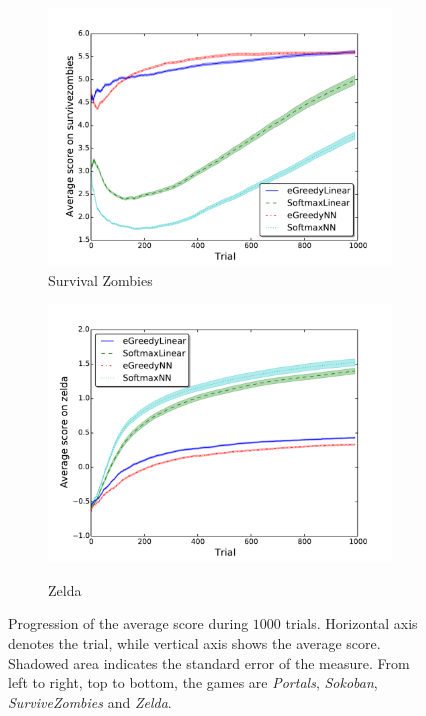 \documentclass[conference]{IEEEtran}
\begin{document}
\begin{figure}[!t]
\begin{center}
\begin{subfigure} {\lefig\textwidth}
	\includegraphics[width = \textwidth]{img/survivezombies_scores}
  \caption{Survival Zombies}
\end{subfigure}\begin{subfigure} {\lefig\textwidth}
	\includegraphics[width = \textwidth]{img/zelda_scores}\\
  \caption{Zelda}
\end{subfigure}

	\caption{Progression of the average score during $1000$ trials. Horizontal axis denotes the trial, while vertical axis shows the average score. Shadowed area indicates the standard error of the measure. From left to right, top to bottom, the games are \textit{Portals}, \textit{Sokoban}, \textit{SurviveZombies} and \textit{Zelda}.}
	\label{fig:results2}
	\end{center}
\end{figure}
\end{document}
